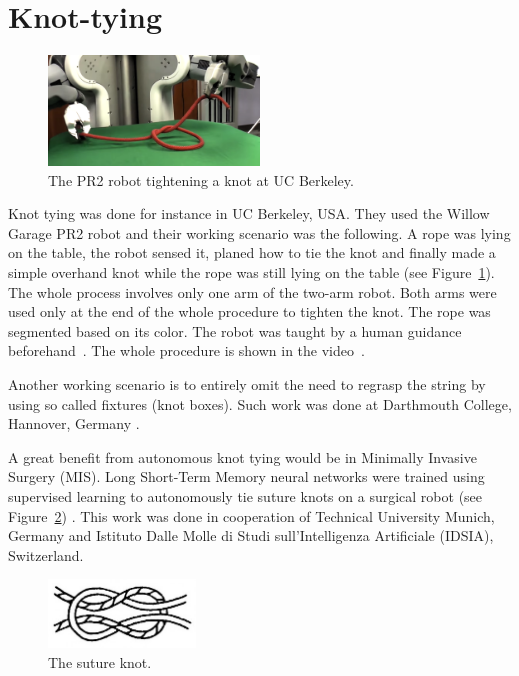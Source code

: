     \section{Knot-tying}

        \begin{figure}[h]
        \includegraphics[width=0.5\textwidth]{PR2Knot.png}
        \centering
        \caption{The PR2 robot tightening a knot at UC Berkeley.}
        \label{fig:PR2Knot}
        \end{figure}

        Knot tying was  done for instance in UC Berkeley, USA. They used the Willow Garage PR2 robot and their working scenario was the following. A rope was lying on the table, the robot sensed it, planed how to tie the knot and finally made a simple overhand knot while the rope was still lying on the table (see Figure~\ref{fig:PR2Knot}). The whole process involves only one arm of the two-arm robot. Both arms were used only at the end of the whole procedure to tighten the knot. The rope was segmented based on its color. The robot was taught by a human guidance beforehand~\cite{UCBerkeleyOverhandKnotArticle}. The whole procedure is shown in the video~\cite{UCBerkeleyOverhandKnotVideo}.

        Another working scenario is to entirely omit the need to regrasp the string by using so called fixtures (knot boxes). Such work was done at Darthmouth College, Hannover, Germany \cite{FixtureKnotTying}.

        A great benefit from autonomous knot tying would be in Minimally Invasive Surgery (MIS).  Long Short-Term Memory neural networks were trained using supervised learning to autonomously tie suture knots on a surgical robot (see Figure~\ref{fig:SutureKnot}) \cite{SutureKnotTying}. This work was done in cooperation of Technical University Munich, Germany and Istituto Dalle Molle di Studi sull’Intelligenza Artificiale (IDSIA), Switzerland.

        \begin{figure}
        \includegraphics[width=0.35\textwidth]{SutureKnot2.png}
        \centering
        \caption{The suture knot.}
        \label{fig:SutureKnot}
        \end{figure}


